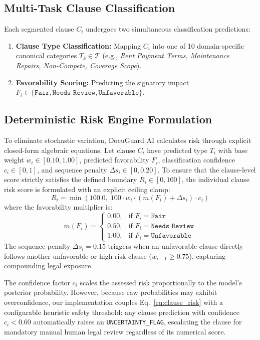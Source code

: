 \documentclass[conference]{IEEEtran}
\begin{document}
\subsection{Multi-Task Clause Classification}
Each segmented clause $C_i$ undergoes two simultaneous classification predictions:
\begin{enumerate}
    \item \textbf{Clause Type Classification:} Mapping $C_i$ into one of 10 domain-specific canonical categories $T_k \in \mathcal{T}$ (e.g., \textit{Rent Payment Terms, Maintenance Repairs, Non-Compete, Coverage Scope}).
    \item \textbf{Favorability Scoring:} Predicting the signatory impact $F_i \in \{\texttt{Fair}, \texttt{Needs Review}, \texttt{Unfavorable}\}$.
\end{enumerate}

\subsection{Deterministic Risk Engine Formulation}
To eliminate stochastic variation, DocuGuard AI calculates risk through explicit closed-form algebraic equations. Let clause $C_i$ have predicted type $T_i$ with base weight $w_i \in [0.10, 1.00]$, predicted favorability $F_i$, classification confidence $c_i \in [0, 1]$, and sequence penalty $\Delta s_i \in [0, 0.20]$. To ensure that the clause-level score strictly satisfies the defined boundary $R_i \in [0, 100]$, the individual clause risk score is formulated with an explicit ceiling clamp:
\begin{equation}
R_i = \min\left(100.0,\; 100 \cdot w_i \cdot (m(F_i) + \Delta s_i) \cdot c_i\right)
\label{eq:clause_risk}
\end{equation}
where the favorability multiplier is:
\begin{equation}
m(F_i) = \begin{cases} 
0.00, & \text{if } F_i = \texttt{Fair} \\
0.50, & \text{if } F_i = \texttt{Needs Review} \\
1.00, & \text{if } F_i = \texttt{Unfavorable}
\end{cases}
\end{equation}
The sequence penalty $\Delta s_i = 0.15$ triggers when an unfavorable clause directly follows another unfavorable or high-risk clause ($w_{i-1} \ge 0.75$), capturing compounding legal exposure.

The confidence factor $c_i$ scales the assessed risk proportionally to the model's posterior probability. However, because raw probabilities may exhibit overconfidence, our implementation couples Eq.~\eqref{eq:clause_risk} with a configurable heuristic safety threshold: any clause prediction with confidence $c_i < 0.60$ automatically raises an \texttt{UNCERTAINTY\_FLAG}, escalating the clause for mandatory manual human legal review regardless of its numerical score.
\end{document}
